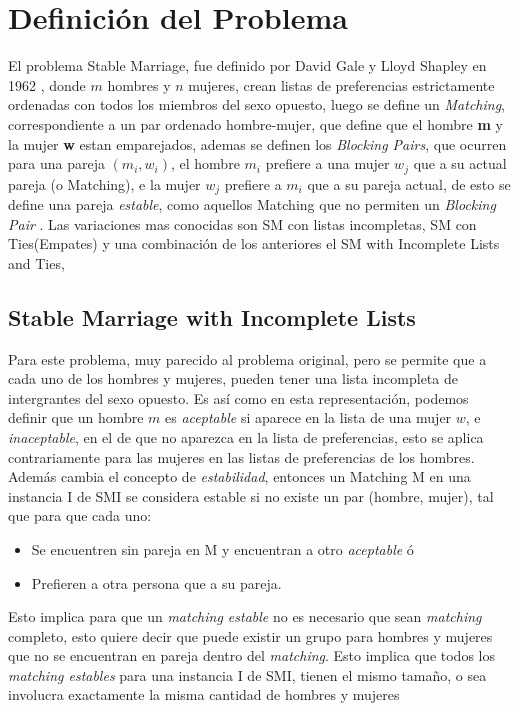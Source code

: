 \documentclass[letter, 10pt]{article}
\begin{document}
\section{Definici\'on del Problema}

 El problema Stable Marriage, fue definido por David Gale y Lloyd Shapley en 1962 \cite{GaleShapley62},
 donde $m$ hombres y $n$ mujeres, crean listas de preferencias estrictamente ordenadas con todos los miembros del sexo opuesto, 
luego se define un \textit{Matching}, correspondiente a un par ordenado hombre-mujer, que define que 
el hombre \textbf{m} y la mujer \textbf{w} estan emparejados, ademas se definen los \textit{Blocking Pairs}, que ocurren para una pareja
$(m_i,w_i)$, el hombre $m_i$ prefiere a una mujer $w_j$ que a su actual pareja (o Matching), e la mujer $w_j$ prefiere a $m_i$ 
que a su pareja actual, de esto se define una pareja \textit{estable}, como aquellos Matching que no permiten un 
\textit{Blocking Pair} .
 Las variaciones mas conocidas son SM con listas incompletas, SM con Ties(Empates) y una combinaci\'on de los anteriores el 
SM with Incomplete Lists and Ties, 

\subsection{Stable Marriage with Incomplete Lists}
Para este problema, muy parecido al problema original, pero se permite que a cada uno de los hombres y mujeres, pueden tener
una lista incompleta de intergrantes del sexo opuesto. Es as\'i como en esta representaci\'on, podemos definir
que un hombre $m$ es \textit{aceptable} si aparece en la lista de una mujer $w$, e \textit{inaceptable}, en el de que no aparezca
en la lista de preferencias, esto se aplica contrariamente para las mujeres en las listas de preferencias de los hombres.
\indent Adem\'as cambia el concepto de \textit{estabilidad}, entonces un Matching M en una instancia I de SMI 
se considera estable si no existe un par (hombre, mujer), tal que para que cada uno:
\begin{itemize}
\item Se encuentren sin pareja en M y encuentran a otro \textit{aceptable} \'o
\item Prefieren a otra persona que a su pareja.
\end{itemize}

Esto implica para que un \textit{matching estable} no es necesario que sean \textit{matching} completo, esto quiere decir que puede existir un
grupo para hombres y mujeres que no se encuentran en pareja dentro del \textit{matching}.
Esto implica que todos los \textit{matching estables} para una instancia 
I de SMI, tienen el mismo tama\~no, o sea involucra exactamente la misma cantidad de hombres y mujeres \cite{ManloveIrving02Hard}
\end{document}
